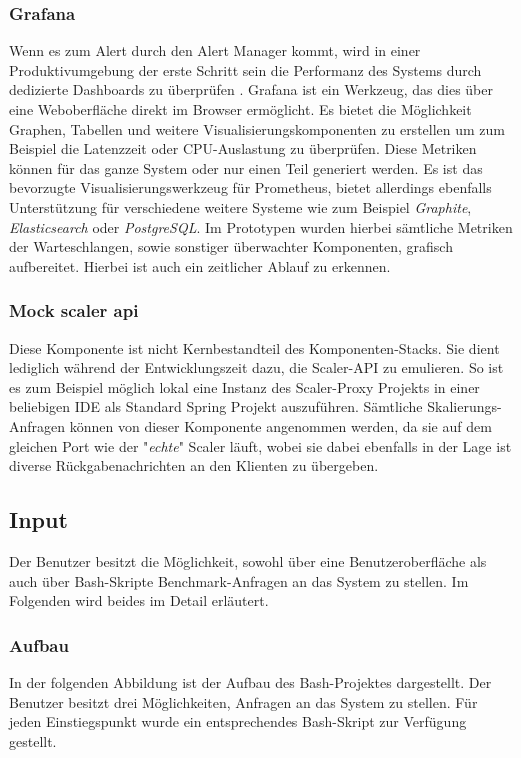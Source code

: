 \subsubsection{Grafana}
Wenn es zum Alert durch den Alert Manager kommt, wird in einer Produktivumgebung der erste Schritt sein die Performanz des Systems durch dedizierte Dashboards zu überprüfen \cite[Seite~97]{oreillyPrometheus}. Grafana ist ein Werkzeug, das dies über eine Weboberfläche direkt im Browser ermöglicht. Es bietet die Möglichkeit Graphen, Tabellen und weitere Visualisierungskomponenten zu erstellen um zum Beispiel die Latenzzeit oder CPU-Auslastung zu überprüfen. Diese Metriken können für das ganze System oder nur einen Teil generiert werden. Es ist das bevorzugte Visualisierungswerkzeug für Prometheus, bietet allerdings ebenfalls Unterstützung für verschiedene weitere Systeme wie zum Beispiel \emph{Graphite}, \emph{Elasticsearch} oder \emph{PostgreSQL}. Im Prototypen wurden hierbei sämtliche Metriken der Warteschlangen, sowie sonstiger überwachter Komponenten, grafisch aufbereitet. Hierbei ist auch ein zeitlicher Ablauf zu erkennen.


\subsubsection{Mock scaler api}
Diese Komponente ist nicht Kernbestandteil des Komponenten-Stacks. Sie dient lediglich während der Entwicklungszeit dazu, die Scaler-API zu emulieren. So ist es zum Beispiel möglich lokal eine Instanz des Scaler-Proxy Projekts in einer beliebigen IDE als Standard Spring Projekt auszuführen. Sämtliche Skalierungs-Anfragen können von dieser Komponente angenommen werden, da sie auf dem gleichen Port wie der "\emph{echte}" Scaler läuft, wobei sie dabei ebenfalls in der Lage ist diverse Rückgabenachrichten an den Klienten zu übergeben.


\subsection{Input}
\label{ss:Input}

Der Benutzer besitzt die Möglichkeit, sowohl über eine Benutzeroberfläche als auch über Bash-Skripte Benchmark-Anfragen an das System zu stellen. Im Folgenden wird beides im Detail erläutert.

\label{ss:bash}
\subsubsection{Aufbau}
In der folgenden Abbildung ist der Aufbau des Bash-Projektes dargestellt. Der Benutzer besitzt drei Möglichkeiten, Anfragen an das System zu stellen. Für jeden Einstiegspunkt wurde ein entsprechendes Bash-Skript zur Verfügung gestellt.

